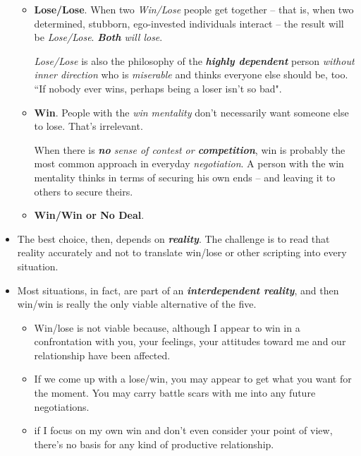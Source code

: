 \documentclass[11pt]{article}
\begin{document}
\begin{itemize}
\begin{itemize}
\item \textbf{Lose/Lose}. When two \emph{Win/Lose} people get together -- that is, when two determined, stubborn, ego-invested individuals interact -- the result will be \emph{Lose/Lose}. \emph{\textbf{Both} will lose}.

\emph{Lose/Lose} is also the philosophy of the \emph{\textbf{highly dependent}} person \emph{without inner direction} who is \emph{miserable} and thinks everyone else should be, too. ``If nobody ever wins, perhaps being a loser isn't so bad".

\item \textbf{Win}. People with the \emph{win mentality} don't necessarily want someone else to lose. That's irrelevant. 

When there is \emph{\textbf{no} sense of contest or \textbf{competition}}, win is probably the most common approach in everyday \emph{negotiation}. A person with the win mentality thinks in terms of securing his own ends -- and leaving it to others to secure theirs.

\item \textbf{Win/Win or No Deal}.
\end{itemize}

\item The best choice, then, depends on \emph{\textbf{reality}}. The challenge is to read that reality accurately and not to translate win/lose or other scripting into every situation.

\item  Most situations, in fact, are part of an \emph{\textbf{interdependent reality}}, and then win/win is really the only viable alternative of the five.
\begin{itemize}
\item Win/lose is not viable because, although I appear to win in a confrontation with you, your feelings, your attitudes toward me and our relationship have been affected.
\item If we come up with a lose/win, you may appear to get what you want for the moment. You may carry battle scars with me into any future negotiations.
\item if I focus on my own win and don't even consider your point of view, there's no basis for any kind of productive relationship.
\end{itemize}
\end{itemize}
\end{document}
